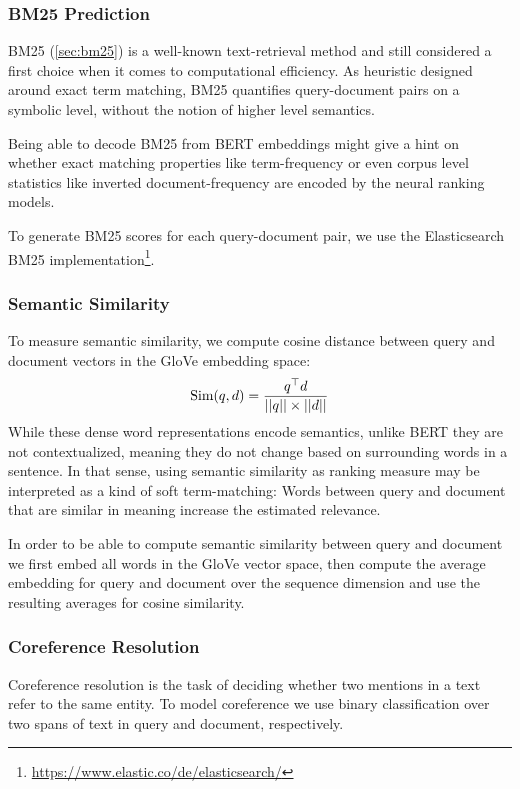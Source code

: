 \subsubsection{BM25 Prediction}
BM25 (\autoref{sec:bm25}) is a well-known text-retrieval method and still considered a first choice when it comes to computational efficiency. As heuristic designed around exact term matching, BM25 quantifies query-document pairs on a symbolic level, without the notion of higher level semantics.

Being able to decode BM25 from BERT embeddings might give a hint on whether exact matching properties like term-frequency or even corpus level statistics like inverted document-frequency are encoded by the neural ranking models.

To generate BM25 scores for each query-document pair, we use the Elasticsearch BM25 implementation\footnote{\url{https://www.elastic.co/de/elasticsearch/}}.

\subsubsection{Semantic Similarity}
To measure semantic similarity, we compute cosine distance between query and document vectors in the GloVe\cite{pennington2014glove} embedding space:
\begin{equation}
    \label{eq:sem_sim}
    \text{Sim}(q, d) = \frac{q^\top d}{||q|| \times ||d||}
\end{equation}
While these dense word representations encode semantics, unlike BERT they are not contextualized, meaning they do not change based on surrounding words in a sentence. In that sense, using semantic similarity as ranking measure may be interpreted as a kind of soft term-matching: Words between query and document that are similar in meaning increase the estimated relevance.

In order to be able to compute semantic similarity between query and document we first embed all words in the GloVe \cite{pennington2014glove} vector space, then compute the average embedding for query and document over the sequence dimension and use the resulting averages for cosine similarity.

\subsubsection{Coreference Resolution}
Coreference resolution is the task of deciding whether two mentions in a text refer to the same entity. To model coreference we use binary classification over two spans of text in query and document, respectively.

